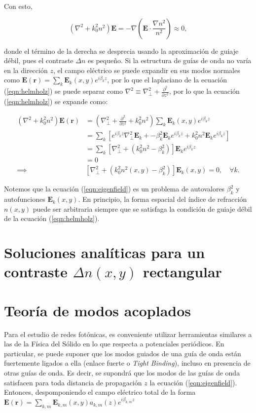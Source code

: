 Con esto, 

\begin{equation}
	(\nabla^2  + k_0^2n^2)\textbf{E} = -\nabla\left(\textbf{E} \cdot \frac{\nabla n^2}{n^2}\right) \approx 0, \label{eqn:helmholz}
\end{equation}

donde el término de la derecha se desprecia usando la aproximación de guiaje débil, pues el contraste $\Delta n$ es pequeño. Si la estructura de guías de onda no varía en la dirección $z$, el campo eléctrico se puede expandir en sus modos normales como $\textbf{E}(\textbf{r}) = \sum_k \textbf{E}_k(x, y) e^{i\beta_k z}$, por lo que el laplaciano de la ecuación (\ref{eqn:helmholz}) se puede separar como $\nabla^2 \equiv \nabla_\perp^2 + \frac{\partial^2}{\partial z^2}$, por lo que la ecuación (\ref{eqn:helmholz}) se expande como:

\begin{align}
	(\nabla^2  + k_0^2n^2) \textbf{E}(\textbf{r}) &= \left(\nabla_\perp^2 + \frac{\partial^2}{\partial z^2} + k_0^2n^2\right)\sum_k \textbf{E}_k(x, y)  e^{i\beta_k z} 
\\	
	&= \sum_k \left[ e^{i\beta_k z} \nabla_\perp^2 \textbf{E}_k + -\beta_k^2\textbf{E}_k e^{i\beta_k z} + k_0^2n^2 \textbf{E}_k  e^{i\beta_k z}\right]
	\\	
	&= \sum_k \left[  \nabla_\perp^2  + (k_0^2n^2-\beta_k^2) \right]\textbf{E}_k  e^{i\beta_k z}
	\\
	&=
	0
	\\
	\implies
	& \left[  \nabla_\perp^2  + (k_0^2n^2(x,y)-\beta_k^2) \right]\textbf{E}_k(x,y)  = 0, \quad \forall k. \label{eqn:eigenfield}
\end{align}

Notemos que la ecuación (\ref{eqn:eigenfield}) es un problema de autovalores $\beta_k^2$ y autofunciones $\textbf{E}_k(x,y)$. En principio, la forma espacial del índice de refracción $n(x, y)$ puede ser arbitraria siempre que se satisfaga la condición de guiaje débil de la ecuación (\ref{eqn:helmholz}). 

\section{Soluciones analíticas para un contraste $\Delta n(x,y)$ rectangular}

\section{Teoría de modos acoplados}
	Para el estudio de redes fotónicas, es conveniente utilizar herramientas similares a las de la Física del Sólido en lo que respecta a potenciales periódicos. En particular, se puede suponer que los modos guiados de una guía de onda están fuertemente ligados a ella (enlace fuerte o \textit{Tight Binding}), incluso en presencia de otras guías de onda. Es decir, se supondrá que los modos de las guías de onda satisfacen para toda distancia de propagación $z$ la ecuación (\ref{eqn:eigenfield}). Entonces, despomponiendo el campo eléctrico total de la forma $\textbf{E}(\textbf{r}) = \sum_{k, m} \textbf{E}_{k, m}(x, y) a_{k, m}(z) e^{i\beta_{k, m} z}$
	


